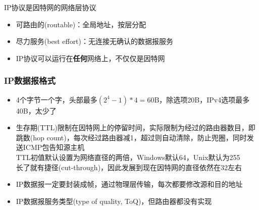 IP协议是因特网的网络层协议
\begin{itemize}
\item 可路由的(routable)：全局地址，按层分配
\item 尽力服务(best effort)：无连接无确认的数据报服务
\item IP协议可以运行在\textbf{任何}网络上，不仅仅是因特网
\end{itemize}

\subsubsection{IP数据报格式}
\begin{itemize}
\item 4个字节一个字，头部最多$(2^4-1)*4=60$B，除选项20B，IPv4选项最多40B，太少了
\item 生存期(TTL)限制在因特网上的停留时间，实际限制为经过的路由器数目，即跳数(hop count)，每次经过路由器减1，超过则自动清除，防止兜圈，同时发送ICMP包告知源主机\\
TTL初值默认设置为网络直径的两倍，Windows默认64，Unix默认为255\\
长了就有捷径(cut-through)，因此发展到现在因特网的直径依然在32左右
\item IP数据报一定要封装成帧，通过物理层传输，每次都要修改源和目的地址
\item IP数据报服务类型(type of quality, ToQ)，但路由器都没有实现
\end{itemize}

